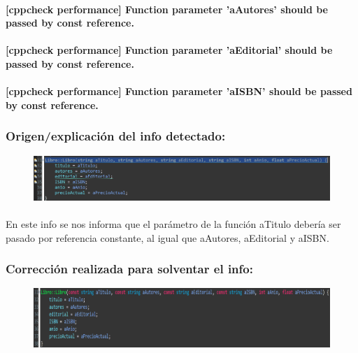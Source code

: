 		\paragraph{[cppcheck performance] Function parameter 'aAutores' should be passed by const reference.	}
		
		\paragraph{[cppcheck performance] Function parameter 'aEditorial' should be passed by const reference.}
		
		\paragraph{[cppcheck performance] Function parameter 'aISBN' should be passed by const reference.}
	
		\subsubsection{Origen/explicación del info detectado:}
		
			\begin{figure}[H]
				\centering
				\includegraphics[scale=0.55]{img/esteban10.png}
				\label{esteban10}
			\end{figure}
		
			\paragraph{}En este info se nos informa que el parámetro de la función aTitulo debería ser pasado por referencia constante, al igual que aAutores, aEditorial y aISBN.
			
		\subsubsection{ Corrección realizada para solventar el info:}
		
			\begin{figure}[H]
				\centering
				\includegraphics[scale=0.55]{img/esteban11.png}
				\label{esteban11}
			\end{figure}
		
